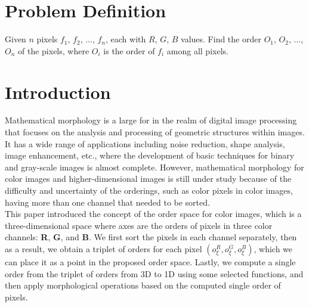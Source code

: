 \section*{Problem Definition}
Given $n$ pixels $f_1$, $f_2$, ..., $f_n$, each with $R$, $G$, $B$ values. Find the order $O_1$, $O_2$, ..., $O_n$ of the pixels, where $O_i$ is the order of $f_i$ among all pixels.



\section*{Introduction}

Mathematical morphology is a large for in the realm of digital image processing that focuses on the analysis and processing of geometric structures within images. It has a wide range of applications including noise reduction, shape analysis, image enhancement, etc., where the development of basic techniques for binary and gray-scale images is almost complete. However, mathematical morphology for color images and higher-dimensional images is still under study because of the difficulty and uncertainty of the orderings, such as color pixels in color images, having more than one channel that needed to be sorted.\\

This paper introduced the concept of the order space for color images, which is a three-dimensional space where axes are the orders of pixels in three color channels: \textbf{R}, \textbf{G}, and \textbf{B}. We first sort the pixels in each channel separately, then as a result, we obtain a triplet of orders for each pixel $(o_{\xi}^{R}, o_{\xi}^{G}, o_{\xi}^{B})$, which we can place it as a point in the proposed order space. Lastly, we compute a single order from the triplet of orders from 3D to 1D using some selected functions, and then apply morphological operations based on the computed single order of pixels.

